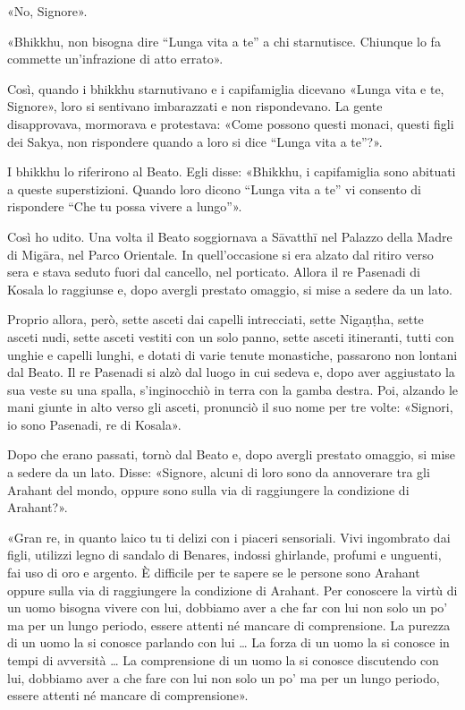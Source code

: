 «No, Signore».

«Bhikkhu, non bisogna dire “Lunga vita a te” a chi starnutisce. Chiunque lo fa
commette un’infrazione di atto errato».

Così, quando i bhikkhu starnutivano e i capifamiglia dicevano «Lunga vita e te,
Signore», loro si sentivano imbarazzati e non rispondevano. La gente
disapprovava, mormorava e protestava: «Come possono questi monaci, questi figli
dei Sakya, non rispondere quando a loro si dice “Lunga vita a te”?».

I bhikkhu lo riferirono al Beato. Egli disse: «Bhikkhu, i capifamiglia sono
abituati a queste superstizioni. Quando loro dicono “Lunga vita a te” vi
consento di rispondere “Che tu possa vivere a lungo”».


 Così ho udito. Una volta il Beato soggiornava a Sāvatthī nel
Palazzo della Madre di Migāra, nel Parco Orientale. In quell’occasione si era
alzato dal ritiro verso sera e stava seduto fuori dal cancello, nel porticato.
Allora il re Pasenadi di Kosala lo raggiunse e, dopo avergli prestato omaggio,
si mise a sedere da un lato.

Proprio allora, però, sette asceti dai capelli intrecciati, sette Nigaṇṭha,
sette asceti nudi, sette asceti vestiti con un solo panno, sette asceti
itineranti, tutti con unghie e capelli lunghi, e dotati di varie tenute
monastiche, passarono non lontani dal Beato. Il re Pasenadi si alzò dal luogo in
cui sedeva e, dopo aver aggiustato la sua veste su una spalla, s’inginocchiò in
terra con la gamba destra. Poi, alzando le mani giunte in alto verso gli asceti,
pronunciò il suo nome per tre volte: «Signori, io sono Pasenadi, re di Kosala».

Dopo che erano passati, tornò dal Beato e, dopo avergli prestato omaggio, si
mise a sedere da un lato. Disse: «Signore, alcuni di loro sono da annoverare tra
gli Arahant del mondo, oppure sono sulla via di raggiungere la condizione di
Arahant?».

«Gran re, in quanto laico tu ti delizi con i piaceri sensoriali. Vivi ingombrato
dai figli, utilizzi legno di sandalo di Benares, indossi ghirlande, profumi e
unguenti, fai uso di oro e argento. È difficile per te sapere se le persone sono
Arahant oppure sulla via di raggiungere la condizione di Arahant. Per conoscere
la virtù di un uomo bisogna vivere con lui, dobbiamo aver a che far con lui non
solo un po’ ma per un lungo periodo, essere attenti né mancare di comprensione.
La purezza di un uomo la si conosce parlando con lui … La forza di un uomo la si
conosce in tempi di avversità … La comprensione di un uomo la si conosce
discutendo con lui, dobbiamo aver a che fare con lui non solo un po’ ma per un
lungo periodo, essere attenti né mancare di comprensione».


